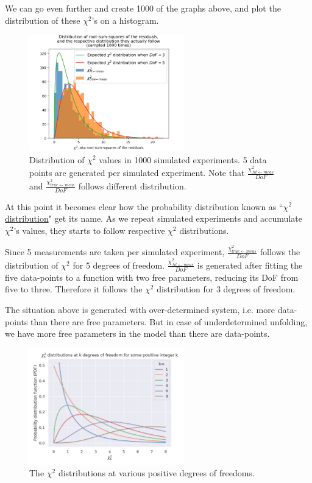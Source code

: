 \documentclass[a4paper, 12pt]{article}
\newcommand{\chifit}{\frac{\chi^2_{fit\leftarrow meas}}{DoF} }
\newcommand{\chitrue}{\frac{\chi^2_{true\leftarrow meas}}{DoF}}
\begin{document}
We can go even further and create 1000 of the graphs above, and plot the distribution of these $\chi^2$'s on a histogram.

\begin{figure}[H]
\centering
\includegraphics[width=0.6\textwidth]{Distribution_of_chi2.png}
\caption{Distribution of $\chi^2$ values in 1000 simulated experiments. 5 data points are generated per simulated experiment. Note that $\chifit$ and $\chitrue$ follows different distribution.}
\end{figure}

At this point it becomes clear how the probability distribution known as ``\href{https://en.wikipedia.org/wiki/Chi2_distribution}{$\chi^2$ distribution}" get its name. As we repeat simulated experiments and accumulate $\chi^2$'s values, they starts to follow respective $\chi^2$ distributions.

Since 5 measurements are taken per simulated experiment, $\chitrue$ follows the distribution of $\chi^2$ for 5 degrees of freedom. $\chifit$ is generated after fitting the five data-points to a function with two free parameters, reducing its DoF from five to three. Therefore it follows the $\chi^2$ distribution for 3 degrees of freedom.

The situation above is generated with over-determined system, i.e. more data-points than there are free parameters. But in case of underdetermined unfolding, we have more free parameters in the model than there are data-points.

\begin{figure}[H]
\centering
\includegraphics[width=0.6\textwidth]{Wiki_chi2.png}
\caption{The $\chi^2$ distributions at various positive degrees of freedoms.}\label{Wiki_chi2}
\end{figure}
\end{document}
